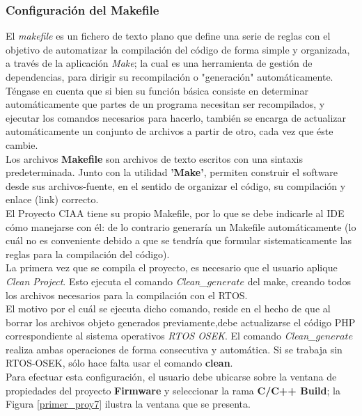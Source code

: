 \documentclass[12pt,letterpaper]{article}
\begin{document}
\subsubsection{Configuración del Makefile}
El \textit{makefile} es un fichero de texto plano que define una serie de reglas con el objetivo de automatizar la compilación del código de forma simple y organizada, a través de la aplicación \textit{Make}; la cual es una herramienta de gestión de dependencias, para dirigir su recompilación o "generación" automáticamente.
Téngase en cuenta que si bien su función básica consiste en determinar automáticamente que partes de un programa necesitan ser recompilados, y ejecutar los comandos necesarios para hacerlo, también se encarga de actualizar automáticamente un conjunto de archivos a partir de otro, cada vez que éste cambie.\\
Los archivos \textbf{Makefile} son archivos de texto escritos con una sintaxis predeterminada. Junto con la utilidad \textbf{'Make'}, permiten construir el software desde sus archivos-fuente, en el sentido de organizar el código, su compilación y enlace (link) correcto.\\
El Proyecto CIAA tiene su propio Makefile, por lo que se debe indicarle al IDE cómo manejarse con él: de lo contrario generaría un Makefile automáticamente (lo cuál no es conveniente debido a que se tendría que formular sistematicamente las reglas para la compilación del código).\\
La primera vez que se compila el proyecto, es necesario que el usuario aplique \textit{Clean Project}. Esto ejecuta el comando \textit{Clean\_$generate$} del make, creando todos los archivos necesarios para la compilación con el RTOS.\\
El motivo por el cuál se ejecuta dicho comando, reside en el hecho de que al borrar los archivos objeto generados previamente,debe actualizarse el código PHP correspondiente al sistema operativos \emph{RTOS OSEK}. El comando \textit{Clean\_$generate$} realiza ambas operaciones de forma consecutiva y automática. Si se trabaja sin RTOS-OSEK, sólo hace falta usar el comando \textbf{clean}.\\

Para efectuar esta configuración, el usuario debe ubicarse sobre la ventana de propiedades del proyecto \textbf{Firmware} y seleccionar la rama \textbf{C/C++ Build}; la Figura \ref{primer_proy7} ilustra la ventana que se presenta.
\end{document}
